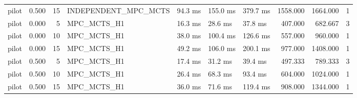 \begin{table}
{\begin{tabular}{lrrllllrrr}
pilot & 0.500 & 15 & INDEPENDENT\_MPC\_MCTS & 94.3 ms & 155.0 ms & 379.7 ms & 1558.000 & 1664.000 & 1 \\
pilot & 0.000 & 5 & MPC\_MCTS\_H1 & 16.3 ms & 28.6 ms & 37.8 ms & 407.000 & 682.667 & 3 \\
pilot & 0.000 & 10 & MPC\_MCTS\_H1 & 38.0 ms & 100.4 ms & 126.6 ms & 557.000 & 960.000 & 1 \\
pilot & 0.000 & 15 & MPC\_MCTS\_H1 & 49.2 ms & 106.0 ms & 200.1 ms & 977.000 & 1408.000 & 1 \\
pilot & 0.500 & 5 & MPC\_MCTS\_H1 & 17.4 ms & 31.2 ms & 39.4 ms & 497.333 & 789.333 & 3 \\
pilot & 0.500 & 10 & MPC\_MCTS\_H1 & 26.4 ms & 68.3 ms & 93.4 ms & 604.000 & 1024.000 & 1 \\
pilot & 0.500 & 15 & MPC\_MCTS\_H1 & 36.0 ms & 71.6 ms & 119.4 ms & 908.000 & 1344.000 & 1 \\
\bottomrule
\end{tabular}
}
\end{table}
